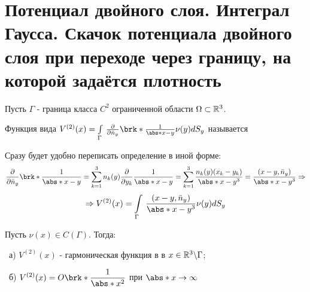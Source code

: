 \section{Потенциал двойного слоя. Интеграл Гаусса. Скачок потенциала двойного слоя при переходе через границу, на которой задаётся плотность}

Пусть $\Gamma$ - граница класса $C^2$ ограниченной области $\Omega \subset \mathbb{R}^3$.

\begin{definition}
Функция вида
$V^{(2)}(x) = \int\limits_{\Gamma} \, \frac{\partial}{\partial \bar{n}_y}\brk*{\frac{1}{\abs*{x-y}}}\nu(y) dS_y $
называется \textit{}
\end{definition}

Сразу будет удобно переписать определение в иной форме:
$$ \frac{\partial}{\partial \bar{n}_y}\brk*{\frac{1}{\abs*{x-y}}} = \sum_{k=1}^3 n_k(y)\frac{\partial}{\partial y_k}\frac{1}{\abs*{x-y}} = \sum_{k=1}^3 \frac{n_k(y)(x_k - y_k)}{\abs*{x-y}^3} = \frac{(x-y, \bar{n}_y)}{\abs*{x-y}^3} \Rightarrow $$
$$ \Rightarrow V^{(2)}(x) = \int\limits_{\Gamma} \, \frac{(x-y, \bar{n}_y)}{\abs*{x-y}^3}\nu(y) dS_y $$

\begin{lemma} Пусть $\nu(x) \in C(\Gamma)$. Тогда:

\
а) $V^{(2)}(x)$ - гармоническая функция в в $x\in \mathbb{R}^3\backslash \Gamma$;

\
б) $\displaystyle V^{(2)}(x) = O\brk*{\frac{1}{\abs*{x}^2}}$ при $\abs*{x} \rightarrow \infty$
\end{lemma}

